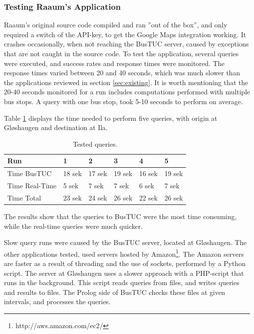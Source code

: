 
\subsubsection{Testing Raaum's Application}
 \label{sec:testing}
Raaum's original source code compiled and ran ''out of the box'', and only required a switch of the API-key, to get the Google Maps integration working. It crashes occasionally, when not reaching the BusTUC server, caused by exceptions that are not caught in the source code. To test the application, several queries were executed, and success rates and response times were monitored. The response times varied between 20 and 40 seconds, which was much slower than the applications reviewed in section \ref{sec:existing}.  It is worth mentioning that the 20-40 seconds monitored for a run includes computations performed with multiple bus stops. A query with one bus stop, took 5-10 seconds to perform on average.


Table \ref{fig:test} displays the time needed to perform five queries, with origin at Gl\o shaugen and destination at Ila. 
\begin{center}
\begin{table}[!h]
\caption{Tested queries.}
\label{fig:test}
\small{
    \begin{tabular}{ |  l  |  l  |  l  |  l  |  l  |  l |}
    \hline
    Run & 1 & 2 & 3 & 4 & 5 \\ \hline
    Time BusTUC & 18 sek & 17 sek & 19 sek & 16 sek & 19 sek \\ \hline
    Time Real-Time & 5 sek & 7 sek & 7 sek & 6 sek & 7 sek \\ \hline
    Time Total & 23 sek & 24 sek & 26 sek & 22 sek & 26 sek \\ \hline
    \end{tabular}
        }
    \end{table}
\end{center} 
The results show that the queries to BusTUC were the most time consuming, while the real-time queries were much quicker.

Slow query runs were caused by the BusTUC server, located at Gl\o shaugen. The other applications tested, used servers hosted by Amazon\footnote{http://aws.amazon.com/ec2/}. The Amazon servers are faster as a result of threading and the use of sockets, performed by a Python script. The server at Gl\o shaugen uses a slower approach with a  PHP-script that runs in the background. This script reads queries from files, and writes queries and results to files. The Prolog side of BusTUC checks these files at given intervals, and processes the queries.

